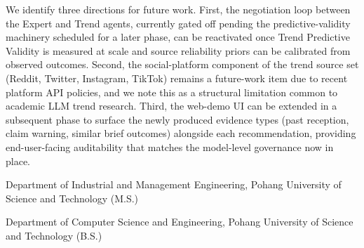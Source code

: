 \documentclass[master,english,final]{postech-ucs}
\begin{document}
We identify three directions for future work.
First, the negotiation loop between the Expert and Trend agents, currently gated off pending the predictive-validity machinery scheduled for a later phase, can be reactivated once Trend Predictive Validity is measured at scale and source reliability priors can be calibrated from observed outcomes.
Second, the social-platform component of the trend source set (Reddit, Twitter, Instagram, TikTok) remains a future-work item due to recent platform API policies, and we note this as a structural limitation common to academic LLM trend research.
Third, the web-demo UI can be extended in a subsequent phase to surface the newly produced evidence types (past reception, claim warning, similar brief outcomes) alongside each recommendation, providing end-user-facing auditability that matches the model-level governance now in place.



\begin{summarykorean}

\end{summarykorean}






\acknowledgement[korean]

\begin{flushright} \end{flushright}

\curriculumvitae[english]

    \begin{personaldata}
    \end{personaldata}

    \begin{education}
	\item[2024. 09.\ --\ 2026. 09.] Department of Industrial and Management Engineering, Pohang University of Science and Technology (M.S.)
	\item[2019. 02.\ --\ 2024. 08.] Department of Computer Science and Engineering, Pohang University of Science and Technology (B.S.)

    \end{education}
\end{document}
